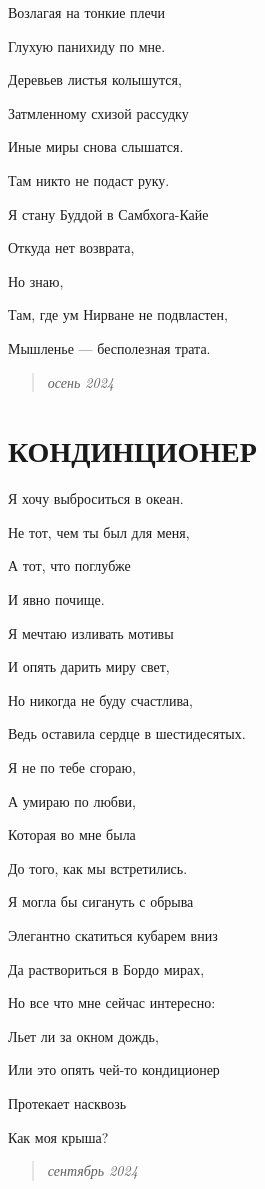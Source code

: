 \documentclass[
  a5paperpaper,
  DIV=11,
  numbers=noendperiod]{scrreprt}
\begin{document}
Возлагая на тонкие плечи

Глухую панихиду по мне.

Деревьев листья колышутся,

Затмленному схизой рассудку

Иные миры снова слышатся.

Там никто не подаст руку.

Я стану Буддой в Самбхога-Кайе

Откуда нет возврата,

Но знаю,

Там, где ум Нирване не подвластен,

Мышленье --- бесполезная трата.

\begin{quote}
\emph{осень 2024}
\end{quote}

\section{КОНДИНЦИОНЕР}\label{ux43aux43eux43dux434ux438ux43dux446ux438ux43eux43dux435ux440}

Я хочу выброситься в океан.

Не тот, чем ты был для меня,

А тот, что поглубже

И явно почище.

Я мечтаю изливать мотивы

И опять дарить миру свет,

Но никогда не буду счастлива,

Ведь оставила сердце в шестидесятых.

Я не по тебе сгораю,

А умираю по любви,

Которая во мне была

До того, как мы встретились.

Я могла бы сигануть с обрыва

Элегантно скатиться кубарем вниз

Да раствориться в Бордо мирах,

Но все что мне сейчас интересно:

Льет ли за окном дождь,

Или это опять чей-то кондиционер

Протекает насквозь

Как моя крыша?

\begin{quote}
\emph{сентябрь 2024}
\end{quote}
\end{document}
